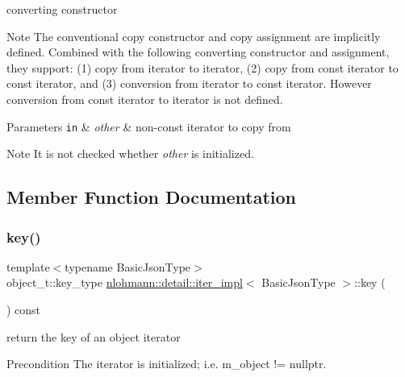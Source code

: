 converting constructor 

\begin{DoxyNote}{Note}
The conventional copy constructor and copy assignment are implicitly defined. Combined with the following converting constructor and assignment, they support\+: (1) copy from iterator to iterator, (2) copy from const iterator to const iterator, and (3) conversion from iterator to const iterator. However conversion from const iterator to iterator is not defined.
\end{DoxyNote}

\begin{DoxyParams}[1]{Parameters}
\mbox{\tt in}  & {\em other} & non-\/const iterator to copy from \\
\hline
\end{DoxyParams}
\begin{DoxyNote}{Note}
It is not checked whether {\itshape other} is initialized. 
\end{DoxyNote}


\subsection{Member Function Documentation}
\mbox{\label{classnlohmann_1_1detail_1_1iter__impl_a3a541a223320f6635f2f188ba54f8818}} 
\subsubsection{\texorpdfstring{key()}{key()}}
{\footnotesize\ttfamily template$<$typename Basic\+Json\+Type$>$ \\
object\+\_\+t\+::key\+\_\+type \hyperlink{classnlohmann_1_1detail_1_1iter__impl}{nlohmann\+::detail\+::iter\+\_\+impl}$<$ Basic\+Json\+Type $>$\+::key (\begin{DoxyParamCaption}{ }\end{DoxyParamCaption}) const\hspace{0.3cm}{\ttfamily [inline]}}



return the key of an object iterator 

\begin{DoxyPrecond}{Precondition}
The iterator is initialized; i.\+e. {\ttfamily m\+\_\+object != nullptr}. 
\end{DoxyPrecond}
\mbox{\label{classnlohmann_1_1detail_1_1iter__impl_aeab0e2b5da70b3bdebecd5b1a6ee66a6}} 

